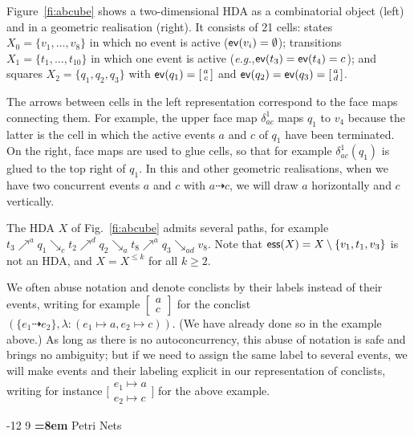 \documentclass[runningheads,envcountsame]{llncs}
\makeatletter
\newcommand*\evord{\dashrightarrow}
\newcommand*\ev{\textup{\textsf{ev}}}
\newcommand*\arrO[1]{\mathrel{\nearrow^{#1}}}
\newcommand*\arrI[1]{\mathrel{\searrow_{#1}}}
\newcommand*\ess{\textup{\textsf{ess}}}
\newcommand*\loset[1]{\left[\begin{smallmatrix}#1\end{smallmatrix}\right]}
\newcommand*\sloset[1]{\big[\begin{smallmatrix}#1\end{smallmatrix}\big]}
\newcommand*\eg{\textit{e.g.},}
\renewcommand\section{\@startsection{section}{1}{\z@}%
  {-12\p@ \@plus -3\p@ \@minus -3\p@}%
  {9\p@ \@plus 3\p@ \@minus 3\p@}%
  {\normalfont\large\bfseries\boldmath
    \rightskip=\z@ \@plus 8em\pretolerance=10000 }}
\makeatother
\begin{document}
\begin{example}
	\label{ex:hda}
	Figure~\ref{fi:abcube} shows a two-dimensional HDA as a combinatorial object (left)
	and in a geometric realisation (right).
	It consists of
	21 cells:
	states $X_0 = \{v_1,\dots, v_8\}$ in which no event is active ($\ev(v_i) = \emptyset$);
	transitions $X_1 = \{t_1,\dots, t_{10}\}$ in which one event is active (\eg $\ev(t_3) = \ev(t_4) = c$);
	and squares $X_2 = \{q_1, q_2, q_3\}$ with $\ev(q_1) = \loset{a\\c}$ and $\ev(q_2) = \ev(q_3) = \loset{a\\d}$.

	The arrows between cells in the left representation correspond to the face maps connecting them.
	For example, the upper face map $\delta^1_{a c}$ maps $q_1$ to $v_4$
	because the latter is the cell in which the active events $a$ and $c$ of $q_1$ have been terminated.
	On the right, face maps are used to glue cells,
	so that for example $\delta^1_{a c}(q_1)$ is glued to the top right of $q_1$.
	In this and other geometric realisations,
	when we have two concurrent events $a$ and $c$ with $a\evord c$, we will draw $a$ horizontally and $c$ vertically.

	The HDA $X$ of Fig.~\ref{fi:abcube} admits several paths, for example
	$t_3\arrO{a} q_1\arrI{c} t_2 \arrO{d} q_2 \arrI{a} t_8 \arrO{a} q_3 \arrI{ad} v_8$.
	Note that $\ess(X) = X \setminus \{v_1,t_1,v_3\}$ is not an HDA, and $X = X^{\le k}$ for all $k \ge 2$.
\end{example}

\begin{remark}
  We often abuse notation and denote conclists by their labels instead of their events,
  writing for example $\loset{a\\c}$ for the conclist $(\{e_1\evord e_2\}, \lambda:(e_1\mapsto a, e_2\mapsto c))$.
  (We have already done so in the example above.)
  As long as there is no autoconcurrency, this abuse of notation is safe and brings no ambiguity;
  but if we need to assign the same label to several events, we will make events and their labeling explicit in our representation of conclists, writing for instance $\sloset{e_1\mapsto a\\e_2\mapsto c}$ for the above example.
\end{remark}

\section{Petri Nets}
\label{sec:pn}
\end{document}
